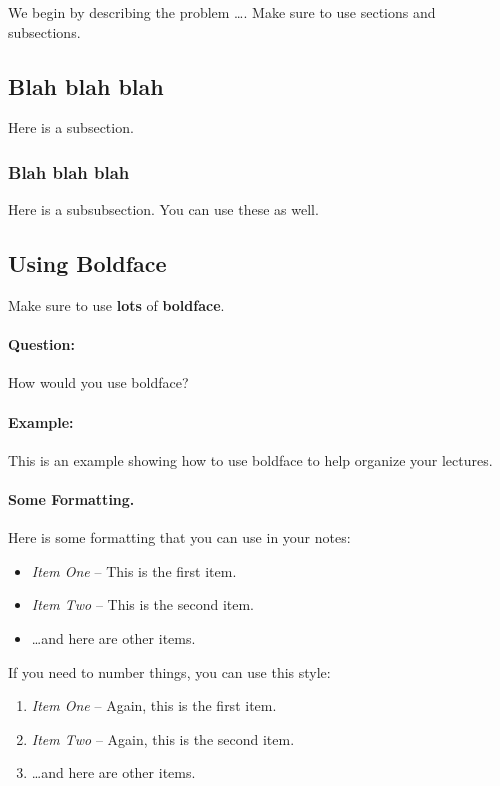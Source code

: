 \documentclass[11pt]{article}
\begin{document}
We begin by describing the problem \ldots.
Make sure to use sections and subsections.

\subsection{Blah blah blah}
Here is a subsection.

\subsubsection{Blah blah blah}
Here is a subsubsection. You can use these as well.

\subsection{Using Boldface}
Make sure to use \textbf{lots} of {\bf boldface}.

\paragraph{Question:}
How would you use boldface?

\paragraph{Example:}
This is an example showing how to use boldface to help organize your
lectures.


\paragraph{Some Formatting.}
Here is some formatting that you can use in your notes:
\begin{itemize}
\item {\em Item One} -- This is the first item.
\item {\em Item Two} -- This is the second item.
\item \dots and here are other items.
\end{itemize}

If you need to number things, you can use this style:
\begin{enumerate}
\item {\em Item One} -- Again, this is the first item.
\item {\em Item Two} -- Again, this is the second item.
\item \dots and here are other items.
\end{enumerate}
\end{document}
